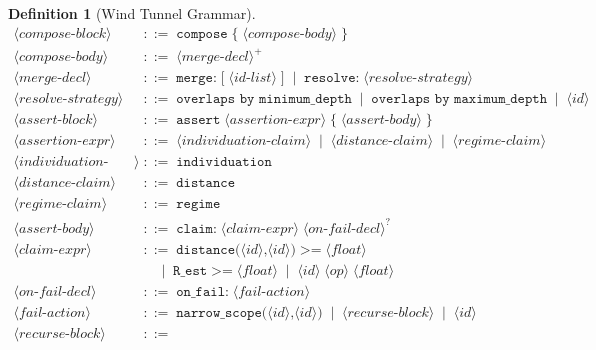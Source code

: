 \documentclass[12pt,a4paper,twocolumn]{article}
\theoremstyle{plain}
\theoremstyle{definition}
\newtheorem{definition}[theorem]{Definition}
\theoremstyle{remark}
\begin{document}
\begin{definition}[Wind Tunnel Grammar]
\begin{align*}
\langle\textit{compose-block}\rangle &\;::=\;
  \texttt{compose}\;\texttt{\{}\;
  \langle\textit{compose-body}\rangle\;\texttt{\}} \\
\langle\textit{compose-body}\rangle &\;::=\;
  \langle\textit{merge-decl}\rangle^+ \\
\langle\textit{merge-decl}\rangle &\;::=\;
  \texttt{merge:}\;\texttt{[}\;\langle\textit{id-list}\rangle\;\texttt{]}
  \;\mid\; \texttt{resolve:}\;\langle\textit{resolve-strategy}\rangle \\
\langle\textit{resolve-strategy}\rangle &\;::=\;
  \texttt{overlaps by minimum\_depth}
  \;\mid\; \texttt{overlaps by maximum\_depth}
  \;\mid\; \langle\textit{id}\rangle \\[4pt]
\langle\textit{assert-block}\rangle &\;::=\;
  \texttt{assert}\;\langle\textit{assertion-expr}\rangle\;\texttt{\{}\;
  \langle\textit{assert-body}\rangle\;\texttt{\}} \\
\langle\textit{assertion-expr}\rangle &\;::=\;
  \langle\textit{individuation-claim}\rangle
  \;\mid\; \langle\textit{distance-claim}\rangle
  \;\mid\; \langle\textit{regime-claim}\rangle \\
\langle\textit{individuation-claim}\rangle &\;::=\;
  \texttt{individuation} \\
\langle\textit{distance-claim}\rangle &\;::=\;
  \texttt{distance} \\
\langle\textit{regime-claim}\rangle &\;::=\;
  \texttt{regime} \\
\langle\textit{assert-body}\rangle &\;::=\;
  \texttt{claim:}\;\langle\textit{claim-expr}\rangle
  \;\langle\textit{on-fail-decl}\rangle^? \\
\langle\textit{claim-expr}\rangle &\;::=\;
  \texttt{distance(}\langle\textit{id}\rangle\texttt{,}\langle\textit{id}\rangle\texttt{)}\;
  \texttt{>=}\;\langle\textit{float}\rangle \\
  &\quad\;\mid\; \texttt{R\_est}\;\texttt{>=}\;\langle\textit{float}\rangle
  \;\mid\; \langle\textit{id}\rangle\;\langle\textit{op}\rangle\;\langle\textit{float}\rangle \\
\langle\textit{on-fail-decl}\rangle &\;::=\;
  \texttt{on\_fail:}\;\langle\textit{fail-action}\rangle \\
\langle\textit{fail-action}\rangle &\;::=\;
  \texttt{narrow\_scope(}\langle\textit{id}\rangle\texttt{,}\langle\textit{id}\rangle\texttt{)}
  \;\mid\; \langle\textit{recurse-block}\rangle
  \;\mid\; \langle\textit{id}\rangle \\[4pt]
\langle\textit{recurse-block}\rangle &\;::=\;

\end{align*}
\end{definition}
\end{document}
